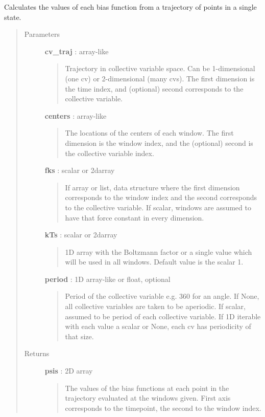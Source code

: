 \documentclass[letterpaper,10pt,english]{sphinxmanual}
\begin{document}
\begin{fulllineitems}
\label{modules/usutils:usutils.calc_harmonic_psis}
Calculates the values of each bias function from a trajectory of points
in a single state.
\begin{quote}\begin{description}
\item[{Parameters}] \leavevmode
\textbf{cv\_traj} : array-like
\begin{quote}

Trajectory in collective variable space.  Can be 1-dimensional (one cv) or 2-dimensional (many cvs).  The first dimension is the time index, and (optional) second corresponds to the collective variable.
\end{quote}

\textbf{centers} : array-like
\begin{quote}

The locations of the centers of each window.  The first dimension is the window index, and the (optional) second is the collective variable index.
\end{quote}

\textbf{fks} : scalar or 2darray
\begin{quote}

If array or list, data structure where the first dimension corresponds to the window index and the second corresponds to the collective variable.  If scalar, windows are assumed to have that force constant in every dimension.
\end{quote}

\textbf{kTs} : scalar or 2darray
\begin{quote}

1D array with the Boltzmann factor or a single value which will be used in all windows.  Default value is the scalar 1.
\end{quote}

\textbf{period} : 1D array-like or float, optional
\begin{quote}

Period of the collective variable e.g. 360 for an angle. If None, all collective variables are taken to be aperiodic.  If scalar, assumed to be period of each collective variable. If 1D iterable with each value a scalar or None, each cv has periodicity of that size.
\end{quote}

\item[{Returns}] \leavevmode
\textbf{psis} : 2D array
\begin{quote}

The values of the bias functions at each point in the trajectory evaluated at the windows given.  First axis corresponds to the timepoint, the second to the window index.
\end{quote}

\end{description}\end{quote}

\end{fulllineitems}
\end{document}
